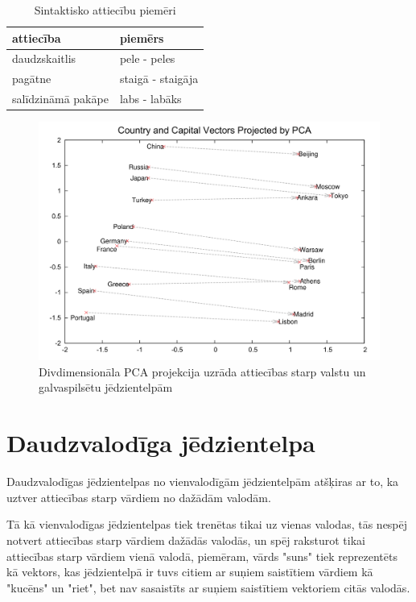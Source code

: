 \begin{table}[htbp]
	\centering
	\caption{Sintaktisko attiecību piemēri \cite{word2vec2013}}
	\begin{tabular}{ll}\toprule
		attiecība & piemērs  \\\midrule
		daudzskaitlis   & pele - peles \\
		pagātne   & staigā - staigāja \\
		salīdzināmā pakāpe   & labs - labāks \\\bottomrule
	\end{tabular}%
	\label{tab:sintactic-relationship-examples}%
\end{table}


\begin{figure}[h]
	\centering
	\includegraphics[width=\textwidth]{figures/word2vec-country-capital.png}
	\caption{Divdimensionāla PCA projekcija uzrāda attiecības starp valstu un galvaspilsētu jēdzientelpām \cite{colyer2016}}
	\label{fig:country-capital}%
\end{figure}



\section{Daudzvalodīga jēdzientelpa}

Daudzvalodīgas jēdzientelpas no vienvalodīgām jēdzientelpām atšķiras ar to, ka uztver attiecības starp vārdiem no dažādām valodām.

Tā kā vienvalodīgas jēdzientelpas tiek trenētas tikai uz vienas valodas, tās nespēj notvert attiecības starp vārdiem dažādās valodās, un spēj raksturot tikai attiecības starp vārdiem vienā valodā, piemēram, vārds "suns" tiek reprezentēts kā vektors, kas jēdzientelpā ir tuvs citiem ar suņiem saistītiem vārdiem kā "kucēns" un "riet", bet nav sasaistīts ar suņiem saistītiem vektoriem citās valodās.

